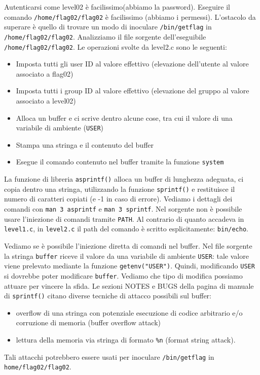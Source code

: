 Autenticarsi come level02 è facilissimo(abbiamo la password). Eseguire il comando \texttt{/home/flag02/flag02} è facilissimo (abbiamo i permessi). L'ostacolo da superare è quello di trovare un modo di inoculare \texttt{/bin/getflag} in
\texttt{/home/flag02/flag02}. Analizziamo il file sorgente dell'eseguibile
\texttt{/home/flag02/flag02}. Le operazioni svolte da level2.c sono le
seguenti:
\begin{itemize}
    \item Imposta tutti gli user ID al valore effettivo
(elevazione dell'utente al valore associato a flag02)
    \item Imposta tutti i group ID al valore effettivo
(elevazione del gruppo al valore associato a
level02)
    \item Alloca un buffer e ci scrive dentro alcune cose, tra
cui il valore di una variabile di ambiente (\texttt{USER})
    \item Stampa una stringa e il contenuto del buffer
    \item Esegue il comando contenuto nel buffer tramite
la funzione \texttt{system}
\end{itemize}
La funzione di libreria \texttt{asprintf()} alloca un buffer di lunghezza adeguata, ci copia dentro una stringa, utilizzando la
funzione \texttt{sprintf()} e restituisce il numero di caratteri copiati (e -1 in caso di errore). Vediamo i dettagli dei comandi con \texttt{man 3 asprintf} e \texttt{man 3 sprintf}. Nel sorgente  non è possibile usare
l'iniezione di comandi tramite \texttt{PATH}. Al contrario di quanto accadeva in \texttt{level1.c},
in \texttt{level2.c} il path del comando è scritto
esplicitamente: \texttt{bin/echo}. 

Vediamo se è possibile l'iniezione diretta di comandi nel buffer. Nel file sorgente la stringa \texttt{buffer} riceve il valore da una variabile di ambiente \texttt{USER}: tale valore viene prelevato mediante la funzione \texttt{getenv("USER")}. Quindi, modificando \texttt{USER} si dovrebbe poter modificare \texttt{buffer}. Vediamo che tipo di modifica possiamo attuare per vincere la sfida. Le sezioni NOTES e BUGS della pagina di manuale di \texttt{sprintf()} citano diverse tecniche di attacco possibili sul buffer:
\begin{itemize}
    \item overflow di una stringa con potenziale esecuzione di codice arbitrario e/o corruzione di memoria (buffer overflow attack)
    \item lettura della memoria via stringa di formato \texttt{\%n} (format string attack). 
\end{itemize}
Tali attacchi potrebbero essere usati per inoculare \texttt{/bin/getflag} in \texttt{home/flag02/flag02}. 

